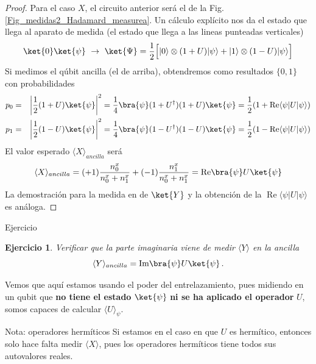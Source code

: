 \documentclass[a4paper,11pt]{book} %
\newtheorem{ejercicio_contador}{Ejercicio}
\newcommand{\Ejercicio}[1]{
		\begin{mybox_gray}{Ejercicio} 
			\begin{ejercicio_contador}
				 #1 
			\end{ejercicio_contador} 
		\end{mybox_gray}
	}
\numberwithin{equation}{chapter}
\def\Lc{\Bigl[}
\def\Rc{\Bigr]}
\begin{document}
	\begin{proof}
	 Para el caso $X$, el circuito anterior será el de la Fig. \ref{Fig_medidas2_Hadamard_measurea}. Un cálculo explícito nos da el estado que llega al aparato de medida (el estado que llega a las lineas punteadas verticales)
	\begin{equation}
	\ket{0}\ket{\psi} ~\to ~ \ket{\Psi} = \frac{1}{2} \Lc \rule{0mm}{3mm} |0\rangle \otimes (1 + U) |\psi\rangle +  |1\rangle \otimes (1 - U) |\psi\rangle \Rc \label{hadam}
	\end{equation}
Si medimos el qúbit ancilla (el de arriba), obtendremos como resultados $\{0,1\}$ con probabilidades 
\begin{eqnarray} 
 p_{0}  &=&  \left\vert \frac{1}{2}  (1 + U) \ket{\psi}  \right\vert^{2} = 
 \frac{1}{4}\bra{\psi}(1 + U^\dagger) (1 + U) \ket{\psi} =\frac{1}{2}(1+\operatorname{Re}\langle \psi|U|\psi\rangle) \nonumber\\
 p_{1}  &=&  \left\vert \frac{1}{2}  (1 - U) \ket{\psi}  \right\vert^{2}=
 \frac{1}{4}\bra{\psi}(1 - U^\dagger) (1 - U) \ket{\psi} =
 \frac{1}{2}(1-\operatorname{Re}\langle \psi|U|\psi\rangle) \nonumber
\end{eqnarray}
El valor esperado $\langle X \rangle_{ancilla}$ será
	\begin{equation}
	\langle X \rangle_{ancilla} = (+1) \frac{n^x_0}{n_0^x+n_1^x} + (-1) \frac{n^x_1}{n^x_0+n^x_1} =  \hbox{Re}\bra{\psi} U \ket{\psi}
	\end{equation}
La demostración para la medida en de $\ket{Y}$ y la obtención de la $\operatorname{Re}\langle \psi|U|\psi\rangle$ es análoga.
	\end{proof}

	\Ejercicio{
	Verificar que la parte imaginaria viene de medir  $\langle Y\rangle$ en la ancilla
	\begin{equation}
	\langle{Y}\rangle_{ancilla}  =  \hbox{Im}\bra{\psi} U \ket{\psi} \, .
	\end{equation}
	}

Vemos que aquí estamos usando el poder del entrelazamiento, pues midiendo en un qubit que\textbf{ no tiene el estado} $\ket{\psi}$ \textbf{ni se ha aplicado el operador} $U$, somos capaces de calcular $\langle U \rangle_\psi$. 

	\begin{mybox_blue}{Nota: operadores hermíticos}
	Si estamos en el caso en que $U$ es hermítico, entonces solo hace falta medir $\langle X \rangle$, pues 
	los operadores hermíticos tiene todos sus autovalores reales.
	\end{mybox_blue}
\end{document}
